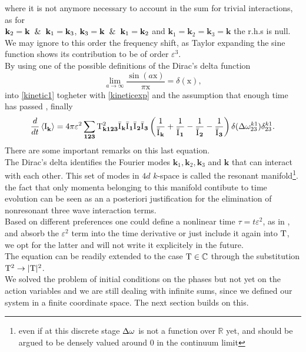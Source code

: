 where it is not anymore necessary to account in the sum for trivial 
interactions, as for \\ $\mathbf{k}_2=\mathbf{k} \hspace{2mm}\&\hspace{2mm} \mathbf{k}_1 = \mathbf{k}_3$, $\mathbf{k}_3=\mathbf{k} \hspace{2mm}\& \hspace{2mm}\mathbf{k}_1=\mathbf{k}_2$ 
and $\mathbf{k}_1=\mathbf{k}_2=\mathbf{k}_3=\mathbf{k}$ the r.h.s is null.\\
We may ignore to this order the frequency shift, as Taylor expanding the sine function shows its contribution to be of order $\varepsilon^3$. \\
By using one of the possible definitions of the Dirac's delta function
\begin{equation}
    \underset{a \rightarrow \infty}{\lim} \frac{\sin(a \mathrm{x})}{\pi\mathrm{x}} = \delta(\mathrm{x}),
    \label{delta}
\end{equation}
into \eqref{kinetic1} togheter with \eqref{kineticexp} and the assumption that enough time has passed
, finally
\begin{equation}
    \frac{d}{dt} \left\langle \mathrm{I}^{}_\mathbf{k}\right\rangle = 4 \pi\varepsilon^2 \sum_{\mathbf{123}} \mathrm{T}^2_\mathbf{k123}\bar{\mathrm{I}^{}}_\mathbf{k}\bar{\mathrm{I}^{}}_\mathbf{1}\bar{\mathrm{I}^{}}_\mathbf{2}\bar{\mathrm{I}^{}}_\mathbf{3}
    \left(\frac{1}{\bar{\mathrm{I}^{}}_\mathbf{k}} + \frac{1}{\bar{\mathrm{I}^{}}_\mathbf{1}} - \frac{1}{\bar{\mathrm{I}^{}}_\mathbf{2}}- \frac{1}{\bar{\mathrm{I}^{}}_\mathbf{3}}  \right)
    \delta(\Delta{\omega}^{k1}_{23})\delta^{k1}_{23}.
    \label{kinetic2}
\end{equation}
There are some important remarks on this last equation. \\
The Dirac's delta identifies the Fourier modes $\mathbf{k}_1, \mathbf{k}_2,\mathbf{k}_3$ and $\mathbf{k}$ that can interact with each other.
This set of modes in $4d$ $k$-space is called the resonant manifold\footnote{even if at this discrete stage $\Delta{\omega}$ is not a function over $\mathbb{R}$ yet,
 and should be argued to be densely valued around $0$ in the continuum limit}. the fact that only momenta belonging to this manifold contibute to time evolution
  can be seen as an a posteriori justification for the elimination of nonresonant three wave interaction terms. \\
Based on different preferences one could define a nonlinear time $\tau = t \varepsilon^2$, as in \cite{Onorato2020}, and absorb the 
$\varepsilon^2$ term into the time derivative or just include it again into $\mathrm{T}$, we opt for the latter and will not write it explicitely in the future. \\
The equation can be readily extended to the case $\mathrm{T} \in \mathbb{C}$ through the substitution $\mathrm{T}^2 \rightarrow |\mathrm{T}|^2$.\\
We solved the problem of initial conditions on the phases but not yet on the action variables and we are still dealing with infinite sums, since we defined our system
in a finite coordinate space. The next section builds on this. \\

